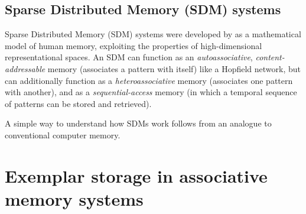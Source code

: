 \documentclass[10pt,letterpaper]{article}
\begin{document}
\subsection{Sparse Distributed Memory (SDM) systems}

Sparse Distributed Memory (SDM) systems were developed by  as a mathematical model of human memory, exploiting the properties of high-dimensional representational spaces.
An SDM can function as an \textit{autoassociative}, \textit{content-addressable} memory (associates a pattern with itself) like a Hopfield network, but can additionally function as a \textit{heteroassociative} memory (associates one pattern with another), and as a \textit{sequential-access} memory (in which a temporal sequence of patterns can be stored and retrieved).

A simple way to understand how SDMs work follows from an analogue to conventional computer memory.





\section{Exemplar storage in associative memory systems}
\end{document}
